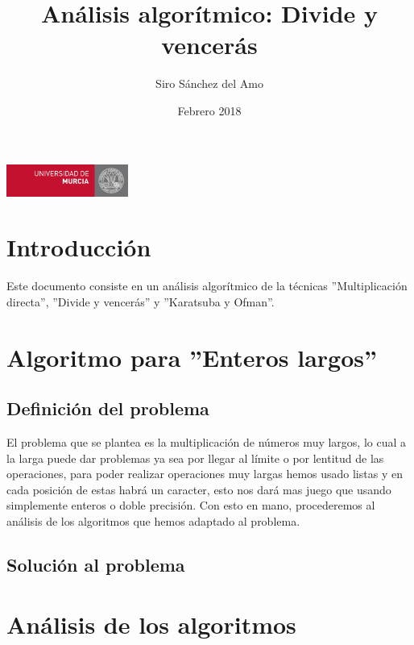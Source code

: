 \documentclass{article}
\title{Análisis algorítmico: Divide y vencerás}
\author{Siro Sánchez del Amo}
\date{Febrero 2018}
\begin{document}
\maketitle
\vfill 
   {\begin{flushright}
   \includegraphics[width=4cm]{umulogo}
   \end{flushright}}

\thispagestyle{empty}
\newpage

\tableofcontents
\thispagestyle{fancy}
\newpage

\section{Introducción}
Este documento consiste en un análisis algorítmico de la técnicas ''Multiplicación directa'', ''Divide y vencerás'' y ''Karatsuba y Ofman''.

\section{Algoritmo para ''Enteros largos''}
\subsection{Definición del problema}
El problema que se plantea es la multiplicación de números muy largos, lo cual a la larga puede dar problemas ya sea por llegar al límite o por lentitud de las operaciones, para poder realizar operaciones muy largas hemos usado listas y en cada posición de estas habrá un caracter, esto nos dará mas juego que usando simplemente enteros o doble precisión. Con esto en mano, procederemos al análisis de los algoritmos que hemos adaptado al problema.

\subsection{Solución al problema}

\newpage
\section{Análisis de los algoritmos}
\end{document}
